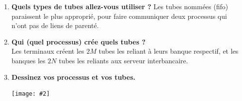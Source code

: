 \documentclass[french, a4paper, 12pt, titlepage]{article}
\newcommand{\graph}[2]{
\medskip
	\begin{center}
		\texttt{[image: \#2]}
	\end{center}
\medskip
}
\begin{document}
\begin{enumerate}
\item \textbf{Quels types de tubes allez-vous utiliser ?}
Les tubes nommées (fifo) paraissent le plus approprié, pour faire communiquer deux processus qui n'ont pas de liens de parenté.\\

\item \textbf{Qui (quel processus) crée quels tubes ?}\\
Les terminaux créent les $2M$ tubes les reliant à leurs banque respectif, et les banques les $2N$ tubes les reliants aux serveur interbancaire.\\

\pagebreak
\item \textbf{Dessinez vos processus et vos tubes.}\\
\graph{0.2}{pipe}

\end{enumerate}
\end{document}

